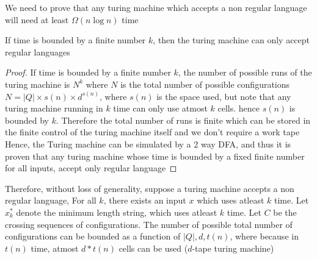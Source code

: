 We need to prove that any turing machine which accepts a non regular language will need at least $\Omega(n \log n)$ time

\begin{claim}
    If time is bounded by a finite number $k$, then the turing machine can only accept regular languages
\end{claim}
\begin{proof}
    If time is bounded by a finite number $k$, the number of possible runs of the turing machine is $N^k$ where $N$ is the total number of possible configurations \\
    $N = |Q| \times s(n) \times d^{s(n)}$, where $s(n)$ is the space used, but note that any turing machine running in $k$ time can only use atmost $k$ cells.
    hence $s(n)$ is bounded by $k$. Therefore the total number of runs is finite which can be stored in the finite control of the turing machine itself and we don't require a work tape
    \\
    Hence, the Turing machine can be simulated by a 2 way DFA, and thus it is proven that any turing machine whose time is bounded by a fixed finite number for all inputs, accept only regular language
\end{proof}

Therefore, without loss of generality, suppose a turing machine accepts a non regular language, 
For all $k$, there exists an input $x$ which uses atleast $k$ time. Let $x_k^*$ denote the minimum length string, which uses atleast $k$ time. Let $C$ be the crossing sequences of configurations. The number of possible total number of configurations can be bounded as a function of $|Q|, d, t(n)$, where because in $t(n)$ time, atmost $d * t(n)$ cells can be used ($d$-tape turing machine)








